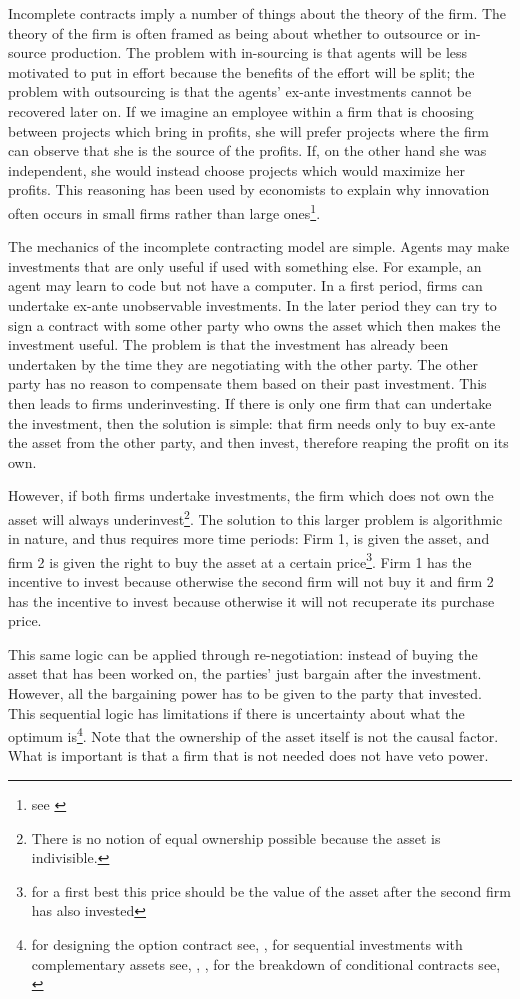 Incomplete contracts imply a number of things about the theory of the firm. The theory of the firm is often framed as being about whether to outsource or in-source production. The problem with in-sourcing is that agents will be less motivated to put in effort because the benefits of the effort will be split; the problem with outsourcing is that the agents' ex-ante investments cannot be recovered later on. If we imagine an employee within a firm that is choosing between projects which bring in profits, she will prefer projects where the firm can observe that she is the source of the profits. If, on the other hand she was independent, she would instead choose projects which would maximize her profits. This reasoning has been used by economists to explain why innovation often occurs in small firms rather than large ones\footnote{see \cite{Holmstrom1989} }.

The mechanics of the incomplete contracting model are simple. Agents may make investments that are only useful if used with something else. For example, an agent may learn to code but not have a computer. In a first period, firms can undertake ex-ante unobservable investments. In the later period they can try to sign a contract with some other party who owns the asset which then makes the investment useful. The problem is that the investment has already been undertaken by the time they are negotiating with the other party. The other party has no reason to compensate them based on their past investment. This then leads to firms underinvesting. If there is only one firm that can undertake the investment, then the solution is simple: that firm needs only to buy ex-ante the asset from the other party, and then invest, therefore reaping the profit on its own.

However, if both firms undertake investments, the firm which does not own the asset will always underinvest\footnote{There is no notion of equal ownership possible because the asset is indivisible.}.  The solution to this larger problem is algorithmic in nature, and thus requires more time periods: Firm 1, is given the asset, and firm 2 is given the right to buy the asset at a certain price\footnote{for a first best this price should be the value of the asset after the second firm has also invested}. Firm 1 has the incentive to invest because otherwise the second firm will not buy it and firm 2 has the incentive to invest because otherwise it will not recuperate its purchase price.

This same logic can be applied through re-negotiation: instead of buying the asset that has been worked on, the parties’ just bargain after the investment. However, all the bargaining power has to be given to the party that invested. This sequential logic has limitations if there is uncertainty about what the optimum is\footnote{for designing the option contract see, \cite{Noldeke1998}, for sequential investments with complementary assets see, \cite{Zhang2014},\cite{bessen_maskin} , for the breakdown of conditional contracts see, \cite{Maskin1999}}. Note that the ownership of the asset itself is not the causal factor. What is important is that a firm that is not needed does not have veto power.

